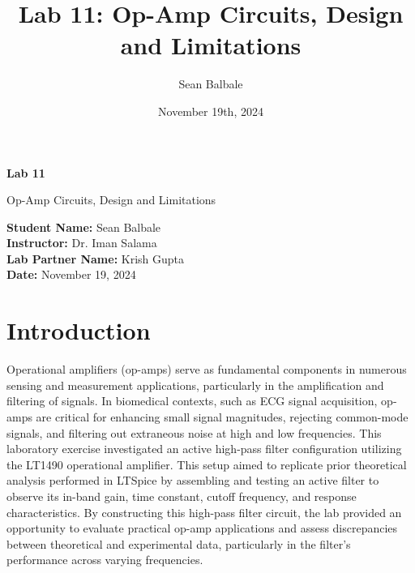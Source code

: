 \documentclass[12pt]{article}
\title{Lab 11: Op-Amp Circuits, Design and Limitations}
\author{Sean Balbale}
\date{November 19th, 2024}
\begin{document}
\begin{titlepage}
  \begin{center}
    \vspace*{1in}

    \Huge
    \textbf{Lab 11}

    \LARGE
    Op-Amp Circuits, Design and Limitations

    \vspace{3 in}

    \textbf{Student Name:} Sean Balbale
    \\ \textbf{Instructor:} Dr. Iman Salama
    \\ \textbf{Lab Partner Name:} Krish Gupta
    \\ \textbf{Date:} November 19, 2024

    \vfill

  \end{center}
\end{titlepage}

\newpage

\section{Introduction}
Operational amplifiers (op-amps) serve as fundamental components in numerous
sensing and measurement applications, particularly in the amplification and
filtering of signals. In biomedical contexts, such as ECG signal acquisition,
op-amps are critical for enhancing small signal magnitudes, rejecting
common-mode signals, and filtering out extraneous noise at high and low
frequencies. This laboratory exercise investigated an active high-pass filter
configuration utilizing the LT1490 operational amplifier. This setup aimed to
replicate prior theoretical analysis performed in LTSpice by assembling and
testing an active filter to observe its in-band gain, time constant, cutoff
frequency, and response characteristics. By constructing this high-pass filter
circuit, the lab provided an opportunity to evaluate practical op-amp
applications and assess discrepancies between theoretical and experimental data,
particularly in the filter's performance across varying frequencies.
\end{document}
